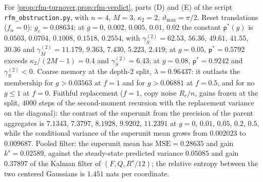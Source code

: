 \begin{numcheck}\label{chk:rfm-turnover}
For \cref{prop:rfm-turnover,prop:rfm-verdict}, parts (D) and (E) of the script \texttt{rfm\_\allowbreak obstruction.py}, with $n=4$, $M=3$, $\kappa_2=2$, $\vartheta_{\max}=\pi/2$. Reset translations ($f_\alpha=0$): $g_c=0.08634$; at $g=0$, $0.002$, $0.005$, $0.01$, $0.02$ the constant $\mathsf p^\ast(g)$ is $0.0503$, $0.0704$, $0.1008$, $0.1518$, $0.2554$, with $\gamma_S^{(2)}=62.53$, $56.36$, $49.61$, $41.55$, $30.36$ and $\gamma_M^{(2)}=11.179$, $9.363$, $7.430$, $5.223$, $2.419$; at $g=0.05$, $\mathsf p^\ast=0.5792$ exceeds $\kappa_2/(2M-1)=0.4$ and $\gamma_S^{(2)}=6.43$; at $g=0.08$, $\mathsf p^\ast=0.9242$ and $\gamma_S^{(2)}<0$. Coarse memory at the depth-2 split, $\lambda=0.96437$: it outlasts the membership for $g>0.03563$ at $f=1$ and for $g>0.06881$ at $f=0.5$, and for no $g\le1$ at $f=0$. Faithful replacement ($f=1$, copy noise $R_c/n$, gains frozen at the split, $4000$ steps of the second-moment recursion with the replacement variance on the diagonal): the contrast of the superunit from the precision of the parent aggregates is $7.1343$, $7.3797$, $8.1928$, $9.9202$, $11.2391$ at $g=0$, $0.01$, $0.05$, $0.2$, $0.5$, while the conditional variance of the superunit mean grows from $0.002023$ to $0.009687$. Pooled filter: the superunit mean has $\mathrm{MSE}=0.28635$ and gain $k^s=0.02589$, against the steady-state predicted variance $0.05085$ and gain $0.37897$ of the Kalman filter of $(F,Q,R^s/12)$; the relative entropy between the two centered Gaussians is $1.451$ nats per coordinate.
\end{numcheck}

